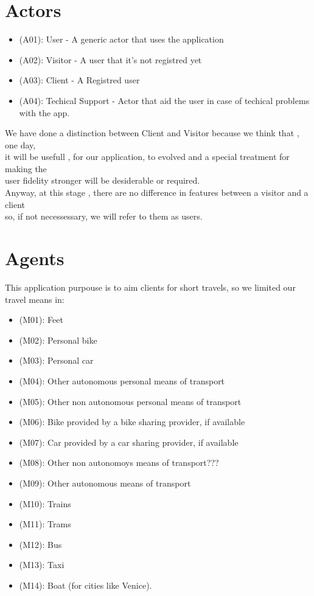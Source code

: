 \documentclass[a4paper,leqno]{book}
\begin{document}
\section{Actors}
\begin{itemize}

\item (A01): User - A generic actor that uses the application
\item (A02): Visitor - A user that it's not registred yet
\item (A03): Client - A Registred user
\item (A04): Techical Support - Actor that aid the user in case of techical problems with the app.

\end{itemize}

We have done a distinction between Client and Visitor because we think that , one day, \\
it will be usefull , for our application, to evolved and a special treatment for making the \\
user fidelity stronger will be desiderable or required.\\

Anyway, at this stage , there are no difference in features between a visitor and a client\\
so, if not necessessary, we will refer to them as users.

\section{Agents}

This application purpouse is to aim clients for short travels, so we limited our travel means in:

\begin{itemize}

\item (M01): Feet 
\item (M02): Personal bike 
\item (M03): Personal car
\item (M04): Other autonomous personal means of transport
\item (M05): Other non autonomous personal means of transport
\item (M06): Bike provided by a bike sharing provider, if available
\item (M07): Car provided by a car sharing provider, if available
\item (M08): Other non autonomoys means of transport???
\item (M09): Other autonomous means of transport
\item (M10): Trains
\item (M11): Trams
\item (M12): Bus 
\item (M13): Taxi
\item (M14): Boat (for cities like Venice).

\end{itemize}
\end{document}
